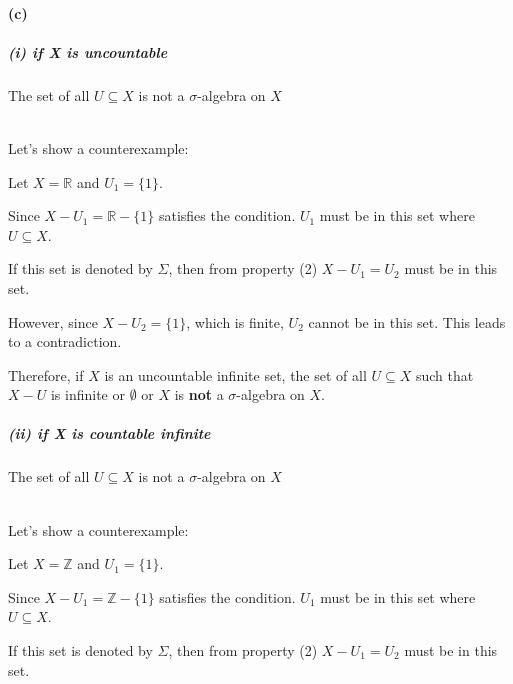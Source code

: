 \documentclass[12pt]{article}
\begin{document}
\paragraph{(c)}
\subparagraph{(i) if X is uncountable}
The set of all \( U \subseteq X \) is not a \(\sigma\)-algebra on \(X\) \\ \\
\par \hspace*{1em}Let's show a counterexample: \\
\par \hspace*{1em}Let \( X = \mathbb{R} \) and \( U_1 = \{1\} \). \\
\par \hspace*{1em}Since \( X - U_1 = \mathbb{R} - \{1\} \) satisfies the condition. \( U_1 \) must be in this set where \( U \subseteq X \).\\
\par \hspace*{1em}If this set is denoted by \( \Sigma \), then from property (2) \( X - U_1 = U_2 \) must be in this set.\\

\par \hspace*{1em}However, since \( X - U_2 = \{1\} \), which is finite, \( U_2 \) cannot be in this set. This leads to a contradiction.\\

\par \hspace*{1em}Therefore, if \( X \) is an uncountable infinite set, the set of all \( U \subseteq X \) such that \( X - U \) is infinite or \(\emptyset\) or \(X\) is \textbf{not}  a \( \sigma \)-algebra on \( X \).\\

\subparagraph{(ii) if X is countable infinite}
The set of all \( U \subseteq X \) is not a \(\sigma\)-algebra on \(X\) \\ \\
\par \hspace*{1em}Let's show a counterexample: \\
\par \hspace*{1em}Let \( X = \mathbb{Z} \) and \( U_1 = \{1\} \). \\
\par \hspace*{1em}Since \( X - U_1 = \mathbb{Z} - \{1\} \) satisfies the condition. \( U_1 \) must be in this set where \( U \subseteq X \).\\
\par \hspace*{1em}If this set is denoted by \( \Sigma \), then from property (2) \( X - U_1 = U_2 \) must be in this set.\\
\end{document}
